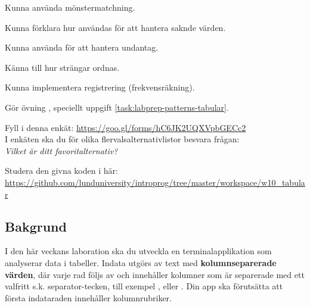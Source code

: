 
\Lab{\LabWeekTEN}

\begin{Goals}
\item Kunna använda mönstermatchning.
\item Kunna förklara hur  användas för att hantera saknde värden.
\item Kunna använda  för att hantera undantag.
\item Känna till hur strängar ordnas.
\item Kunna implementera registrering (frekvensräkning).
\end{Goals}

\begin{Preparations}
\item Gör övning {\texttt{\ExeWeekTEN}}, speciellt uppgift \ref{task:labprep-patterns-tabular}.
\item \ReadTheLab
\item Fyll i denna enkät: \url{https://goo.gl/forms/hC6JK2UQXVpbGECc2}  \\
I enkäten ska du för olika flervalsalternativlistor besvara frågan: \\ \textit{Vilket är ditt favoritalternativ?}
\item Studera den givna koden i  här: \url{https://github.com/lunduniversity/introprog/tree/master/workspace/w10_tabular}
\end{Preparations}


\subsection{Bakgrund}

I den här veckans laboration ska du utveckla en terminalapplikation som analyserar data i tabeller. Indata utgörs av text med \textbf{kolumnseparerade värden}, där varje rad följs av  och innehåller kolumner som är separerade med ett valfritt s.k. separator-tecken, till exempel ,  eller . Din app ska förutsätta att första indataraden innehåller kolumnrubriker.

